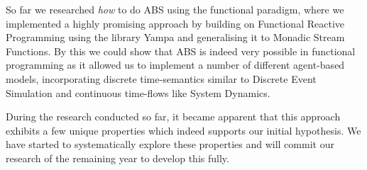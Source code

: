 \documentclass[oneside]{book}
\begin{document}
So far we researched \textit{how} to do ABS using the functional paradigm, where we implemented a highly promising approach by building on Functional Reactive Programming using the library Yampa and generalising it to Monadic Stream Functions. By this we could show that ABS is indeed very possible in functional programming as it allowed us to implement a number of different agent-based models, incorporating discrete time-semantics similar to Discrete Event Simulation and continuous time-flows like System Dynamics.

During the research conducted so far, it became apparent that this approach exhibits a few unique properties which indeed supports our initial hypothesis. We have started to systematically explore these properties and will commit our research of the remaining year to develop this fully.

\clearpage
\tableofcontents
\clearpage















\renewcommand\bibname{References}





\end{document}
